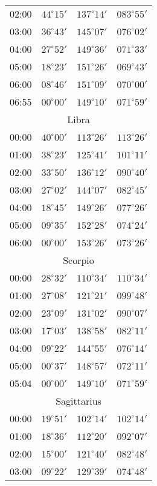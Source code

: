 \begin{table}
\begin{Parallel}{}{}
{{\begin{tabular}{l|lll}
02:00 & $44^\circ 15'$ & $137^\circ 14'$& $083^\circ 55'$ \\
03:00 & $36^\circ 43'$ & $145^\circ 07'$& $076^\circ 02'$ \\
04:00 & $27^\circ 52'$ & $149^\circ 36'$& $071^\circ 33'$ \\
05:00 & $18^\circ 23'$ & $151^\circ 26'$& $069^\circ 43'$ \\
06:00 & $08^\circ 46'$ & $151^\circ 09'$& $070^\circ 00'$ \\
06:55 & $00^\circ 00'$ & $149^\circ 10'$& $071^\circ 59'$ \\
\multicolumn{4}{c}{Libra}\\
00:00 & $40^\circ 00'$ & $113^\circ 26'$& $113^\circ 26'$ \\
01:00 & $38^\circ 23'$ & $125^\circ 41'$& $101^\circ 11'$ \\
02:00 & $33^\circ 50'$ & $136^\circ 12'$& $090^\circ 40'$ \\
03:00 & $27^\circ 02'$ & $144^\circ 07'$& $082^\circ 45'$ \\
04:00 & $18^\circ 45'$ & $149^\circ 26'$& $077^\circ 26'$ \\
05:00 & $09^\circ 35'$ & $152^\circ 28'$& $074^\circ 24'$ \\
06:00 & $00^\circ 00'$ & $153^\circ 26'$& $073^\circ 26'$ \\
\multicolumn{4}{c}{Scorpio}\\
00:00 & $28^\circ 32'$ & $110^\circ 34'$& $110^\circ 34'$ \\
01:00 & $27^\circ 08'$ & $121^\circ 21'$& $099^\circ 48'$ \\
02:00 & $23^\circ 09'$ & $131^\circ 02'$& $090^\circ 07'$ \\
03:00 & $17^\circ 03'$ & $138^\circ 58'$& $082^\circ 11'$ \\
04:00 & $09^\circ 22'$ & $144^\circ 55'$& $076^\circ 14'$ \\
05:00 & $00^\circ 37'$ & $148^\circ 57'$& $072^\circ 11'$ \\
05:04 & $00^\circ 00'$ & $149^\circ 10'$& $071^\circ 59'$ \\
\multicolumn{4}{c}{Sagittarius}\\
00:00 & $19^\circ 51'$ & $102^\circ 14'$& $102^\circ 14'$ \\
01:00 & $18^\circ 36'$ & $112^\circ 20'$& $092^\circ 07'$ \\
02:00 & $15^\circ 00'$ & $121^\circ 40'$& $082^\circ 48'$ \\
03:00 & $09^\circ 22'$ & $129^\circ 39'$& $074^\circ 48'$ \\

\end{tabular}}}
\end{Parallel}
\end{table}
